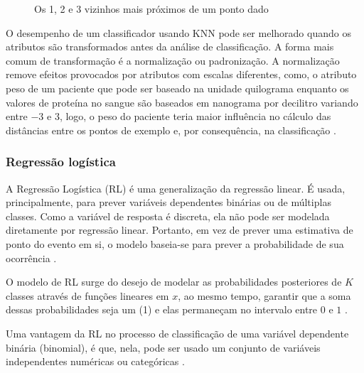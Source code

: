 \begin{figure}[!htb]
  \centering
  \caption{\label{knn} Os 1, 2 e 3 vizinhos mais próximos de um ponto dado}
  \qquad
  \qquad
  \vspace{1.5em}
\end{figure}

O desempenho de um classificador usando KNN pode ser melhorado quando os
atributos são transformados antes da análise de classificação. A forma mais
comum de transformação é a normalização ou padronização. A normalização remove
efeitos provocados por atributos com escalas diferentes, como, o atributo peso
de um paciente que pode ser baseado na unidade quilograma enquanto os valores de
proteína no sangue são baseados em nanograma por decilitro variando entre \(-3\)
e \(3\), logo, o peso do paciente teria maior influência no cálculo das
distâncias entre os pontos de exemplo e, por consequência, na classificação
\cite{peterson2009knn}.

\subsubsection{Regressão logística}

A Regressão Logística (RL) é uma generalização da regressão linear. É usada,
principalmente, para prever variáveis dependentes binárias ou de múltiplas
classes. Como a variável de resposta é discreta, ela não pode ser modelada
diretamente por regressão linear. Portanto, em vez de prever uma estimativa de
ponto do evento em si, o modelo baseia-se para prever a probabilidade de sua
ocorrência \cite{csen2012predicting}.

O modelo de RL surge do desejo de modelar as probabilidades posteriores de \(K\)
classes através de funções lineares em \(x\), ao mesmo tempo, garantir que a
soma dessas probabilidades seja um (1) e elas permaneçam no intervalo entre
\(0\) e \(1\) \cite{james2013introduction}.

Uma vantagem da RL no processo de classificação de uma variável dependente
binária (binomial), é que, nela, pode ser usado um conjunto de variáveis
independentes numéricas ou categóricas \cite{kleinbaum2002analysis}.

